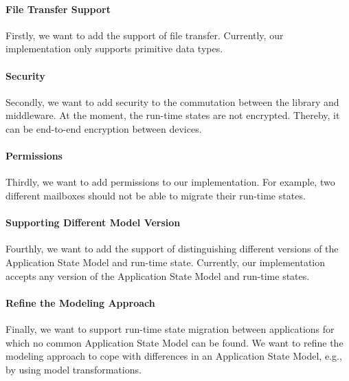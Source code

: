 \paragraph{File Transfer Support}
Firstly, we want to add the support of file transfer. Currently, our implementation only supports primitive data types.

\paragraph{Security}
Secondly, we want to add security to the commutation between the library and middleware. At the moment, the run-time states are not encrypted. Thereby, it can be end-to-end encryption between devices.

\paragraph{Permissions}
Thirdly, we want to add permissions to our implementation. For example, two different mailboxes should not be able to migrate their run-time states.

\paragraph{Supporting Different Model Version}
Fourthly, we want to add the support of distinguishing different versions of the Application State Model and run-time state. Currently, our implementation accepts any version of the Application State Model and run-time states.

\paragraph{Refine the Modeling Approach}
Finally, we want to support run-time state migration between applications for which no common Application State Model can be found. We want to refine the modeling approach to cope with differences in an Application State Model, e.g., by using model transformations.

